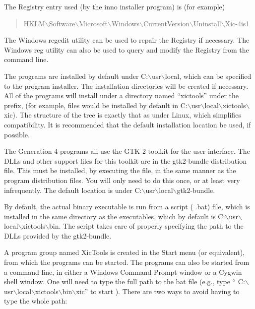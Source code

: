 The Registry entry used (by the {\vt inno} installer program) is
(for example)
\begin{quote}\vt
HKLM$\backslash$Software$\backslash$Microsoft$\backslash$Windows$\backslash$CurrentVersion$\backslash$Uninstall$\backslash$Xic-4is1
\end{quote}

The Windows {\vt regedit} utility can be used to repair the Registry
if necessary.  The Windows {\vt reg} utility can also be used to query
and modify the Registry from the command line.

The programs are installed by default under {\vt
C:{$\backslash$}usr{$\backslash$}local}, which can be specified to the
program installer.  The installation directories will be created if
necessary.  All of the programs will install under a directory named
``{\vt xictools}'' under the prefix, (for example, {\Xic} files would
be installed by default in {\vt
C:$\backslash$usr$\backslash$local$\backslash$xictools$\backslash$xic}). 
The structure of the tree is exactly that as under Linux, which
simplifies compatibility.  It is recommended that the default
installation location be used, if possible.

The Generation 4 programs all use the GTK-2 toolkit for the user
interface.  The DLLs and other support files for this toolkit are in
the {\vt gtk2-bundle} distribution file.  This must be installed, by
executing the file, in the same manner as the program distribution
files.  You will only need to do this once, or at least very
infrequently.  The default location is under {\vt
C:$\backslash$usr$\backslash$local$\backslash$gtk2-bundle}.

By default, the actual binary executable is run from a script ({\vt
.bat}) file, which is installed in the same directory as the
executables, which by default is {\vt
C:$\backslash$usr$\backslash$local$\backslash$xictools$\backslash$bin}. 
The script takes care of properly specifying the path to the DLLs
provided by the gtk2-bundle.

A program group named {\vt XicTools} is created in the {\vt Start}
menu (or equivalent), from which the programs can be started.  The
programs can also be started from a command line, in either a Windows
{\cb Command Prompt} window or a Cygwin shell window.  One will need
to type the full path to the bat file (e.g., type ``{\vt
C:$\backslash$usr$\backslash$local$\backslash$xictools$\backslash$bin$\backslash$xic}''
to start {\Xic}).  There are two ways to avoid having to type the
whole path:

